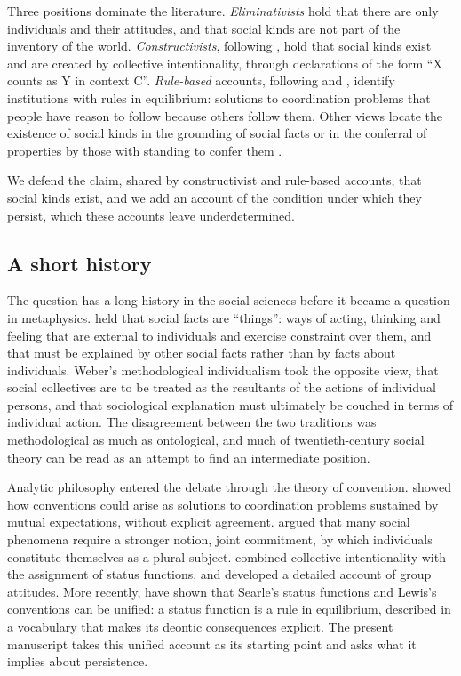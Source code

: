 \documentclass{situationist-preprint}
\begin{document}
Three positions dominate the literature. \emph{Eliminativists} hold that there are only individuals and their attitudes, and that social kinds are not part of the inventory of the world. \emph{Constructivists}, following \citet{Searle1995,Searle2010}, hold that social kinds exist and are created by collective intentionality, through declarations of the form \enquote{X counts as Y in context C}. \emph{Rule-based} accounts, following \citet{GualaHindriks2015} and \citet{Guala2016}, identify institutions with rules in equilibrium: solutions to coordination problems that people have reason to follow because others follow them. Other views locate the existence of social kinds in the grounding of social facts \citep{Epstein2015} or in the conferral of properties by those with standing to confer them \citep{Asta2018}.

We defend the claim, shared by constructivist and rule-based accounts, that social kinds exist, and we add an account of the condition under which they persist, which these accounts leave underdetermined.

\subsection{A short history}

The question has a long history in the social sciences before it became a question in metaphysics. \citet{Durkheim1895} held that social facts are \enquote{things}: ways of acting, thinking and feeling that are external to individuals and exercise constraint over them, and that must be explained by other social facts rather than by facts about individuals. Weber's methodological individualism took the opposite view, that social collectives are to be treated as the resultants of the actions of individual persons, and that sociological explanation must ultimately be couched in terms of individual action. The disagreement between the two traditions was methodological as much as ontological, and much of twentieth-century social theory can be read as an attempt to find an intermediate position.

Analytic philosophy entered the debate through the theory of convention. \citet{Lewis1969} showed how conventions could arise as solutions to coordination problems sustained by mutual expectations, without explicit agreement. \citet{Gilbert1989} argued that many social phenomena require a stronger notion, joint commitment, by which individuals constitute themselves as a plural subject. \citet{Searle1995} combined collective intentionality with the assignment of status functions, and \citet{Tuomela2013} developed a detailed account of group attitudes. More recently, \citet{GualaHindriks2015} have shown that Searle's status functions and Lewis's conventions can be unified: a status function is a rule in equilibrium, described in a vocabulary that makes its deontic consequences explicit. The present manuscript takes this unified account as its starting point and asks what it implies about persistence.
\end{document}
